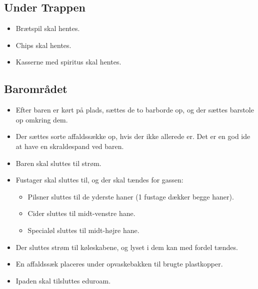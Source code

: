 \subsection{Under Trappen}
\label{sec:pre:under-trappen}

\begin{itemize}
\item Brætspil skal hentes.
\item Chips skal hentes.
\item Kasserne med spiritus skal hentes.
\end{itemize}

\subsection{Barområdet}
\label{sec:pre:baromradet}

\begin{itemize}
\item Efter baren er kørt på plads, sættes de to barborde op, og der sættes barstole op omkring dem.
\item Der sættes sorte affaldssække op, hvis der ikke allerede er. 
    Det er en god ide at have en skraldespand ved baren.
\item Baren skal sluttes til strøm.
\item Fustager skal sluttes til, og der skal tændes for gassen:
  \begin{itemize}
  \item Pilsner sluttes til de yderste haner (1 fustage dækker begge
    haner).
  \item Cider sluttes til midt-venstre hane.
  \item Specialøl sluttes til midt-højre hane.
  \end{itemize}
\item Der sluttes strøm til køleskabene, og lyset i dem kan med fordel tændes.
\item En affaldssæk placeres under opvaskebakken til brugte plastkopper.
\item Ipaden skal tilsluttes eduroam.
\end{itemize}